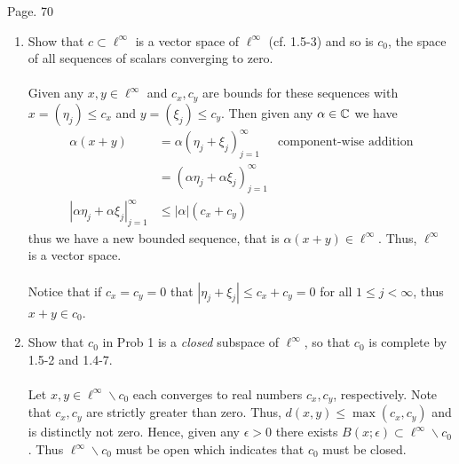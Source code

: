 \documentclass[10pt,a4paper]{report}
\begin{document}
\newpage
Page. 70 
\begin{enumerate}
	\item Show that $c \subset \ell^\infty$ is a vector space of $\ell^\infty$ (cf. 1.5-3) and so is $c_0$, the space of all sequences of scalars converging to zero.\\
	\\
	Given any $x,y \in \ell^\infty$ and $c_x, c_y$ are bounds for these sequences with $x = (\eta_j) \le c_x$ and $y=(\xi_j) \le c_y$.  Then given any $\alpha \in \mathbb{C}$ we have
	\begin{align*}
		\alpha(x + y) &= \alpha(\eta_j + \xi_j)_{j=1}^\infty & \text{component-wise addition} \\
		&= (\alpha\eta_j + \alpha\xi_j)_{j=1}^\infty \\
		|\alpha\eta_j + \alpha\xi_j|_{j=1}^\infty &\le |\alpha|(c_x + c_y)
	\end{align*}thus we have a new bounded sequence, that is $\alpha(x+y) \in \ell^\infty$.  Thus, $\ell^\infty$ is a vector space.\\ \\
	Notice that if $c_x = c_y = 0$ that $|\eta_j + \xi_j| \le c_x+c_y = 0$ for all $1 \le j < \infty$, thus $x+y \in c_0$.\\
	
	\item Show that $c_0$ in Prob 1 is a \textit{closed} subspace of $\ell^\infty$, so that $c_0$ is complete by 1.5-2 and 1.4-7. \\
	\\
	Let $x,y \in \ell^\infty \backslash c_0$ each converges to real numbers $c_x, c_y$, respectively.  Note that $c_x,c_y$ are strictly greater than zero.  Thus, $d(x,y) \le \max(c_x, c_y)$ and is distinctly not zero.  Hence, given any $\epsilon> 0$ there exists $B(x;\epsilon) \subset \ell^\infty\backslash c_0$.  Thus  $\ell^\infty\backslash c_0$ must be open which indicates that $c_0$ must be closed.\\
	

\end{enumerate}
\end{document}
